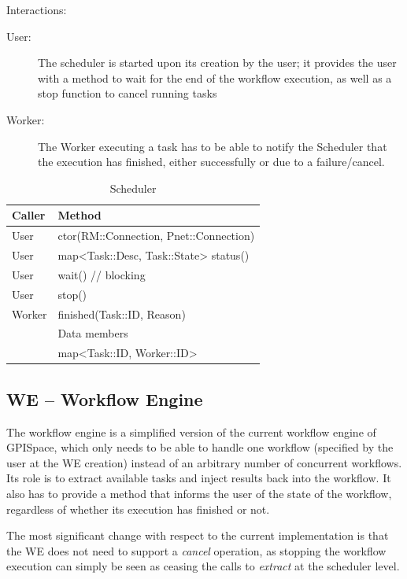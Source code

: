 \documentclass[10pt]{article}
\newcommand{\user}{User\xspace}
\newcommand{\sched}{Scheduler\xspace}
\newcommand{\worker}{Worker\xspace}
\newcommand{\rman}{RM\xspace}
\newcommand{\we}{WE\xspace}
\newcommand{\task}{Task\xspace}
\newcommand{\id}{::ID\xspace}
\newcommand{\conn}{::Connection\xspace}
\begin{document}
Interactions:
\begin{description}
    \item [\user:] The scheduler is started upon its creation by the user; it
    provides the user with a method to wait for the end of the workflow execution,
    as well as a stop function to cancel running tasks 
    \item [\worker:] The \worker executing a task has to be able to notify the
    \sched that the execution has finished, either successfully or due to a
    failure/cancel.
\end{description}
%
\begin{table}[ht]
    \centering
    \caption{Scheduler}
    \label{tab:sched}
    \bgroup
    \setlength{\tabcolsep}{2em}
    \begin{tabular}{ll}
        \toprule
        Caller & Method \\
        \midrule
        \user & ctor(\rman\conn, Pnet\conn) \\
        \user & map<\task::Desc, \task::State> status() \\
        \user & wait() // blocking  \\
        \user & stop() \\
        \worker & finished(\task\id, Reason) \\
        \midrule
        & Data members \\
        \midrule
        & map<\task\id, \worker\id> \\
        \bottomrule
    \end{tabular}
    \egroup
\end{table}
%


\subsection{WE -- Workflow Engine}
\label{sec:we}
The workflow engine is a simplified version of the current workflow engine of
GPISpace, which only needs to be able to handle one workflow (specified by the
user at the \we creation) instead of an arbitrary number of concurrent
workflows. 
Its role is to extract available tasks and inject results back into the
workflow. It also has to provide a method that informs the user of the state of
the workflow, regardless of whether its execution has finished or not.

The most significant change with respect to the current implementation is that
the \we does not need to support a \emph{cancel} operation, as stopping the
workflow execution can simply be seen as ceasing the calls to  \emph{extract} at
the scheduler level. 
\end{document}
